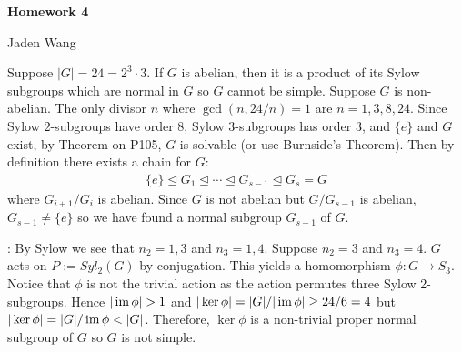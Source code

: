 \documentclass[12pt]{article}
\begin{document}
\centerline {\textsf{\textbf{\LARGE{Homework 4}}}}
\centerline {Jaden Wang}
\vspace{.15in}

\begin{problem}[1]
Suppose $|G|= 24= 2^3 \cdot 3$. If $ G$ is abelian, then it is a product of its Sylow subgroups which are normal in $ G$ so  $ G$ cannot be simple. Suppose $ G$ is non-abelian. The only divisor $ n$ where  $ \gcd ( n,24 /n) =1$ are $ n=1,3,8,24$. Since Sylow $ 2$-subgroups have order 8, Sylow 3-subgroups has order 3, and  $ \{e\} $ and $ G$ exist, by Theorem on P105,  $ G$ is solvable (or use Burnside's Theorem). Then by definition there exists a chain for $ G$:
 \begin{align*}
	\{e\} \trianglelefteq G_1 \trianglelefteq \cdots \trianglelefteq   G_{s-1} \trianglelefteq G_s = G 
\end{align*}
where $ G_{i+1} / G_i$ is abelian. Since $ G$ is not abelian but  $ G / G_{s-1}$ is abelian, $ G_{s-1} \neq \{e\} $ so we have found a normal subgroup $ G_{s-1}$ of $ G$.

 : By Sylow we see that $ n_2 = 1,3$ and $ n_3 = 1,4$. Suppose $ n_2 = 3$ and $ n_3 =4$. $ G$ acts on  $ P := Syl_{ 2}( G) $ by conjugation. This yields a homomorphism $ \phi: G \to S_3$. Notice that $ \phi$ is not the trivial action as the action permutes three Sylow 2-subgroups. Hence  $ |\operatorname{im} \phi| > 1 $ and $ | \ker \phi| = |G| / | \operatorname{im} \phi| \geq 24 / 6 = 4$ but $ | \ker \phi| = |G| / \operatorname{im} \phi < |G|$. Therefore, $ \ker \phi$ is a non-trivial proper normal subgroup of $ G$ so $ G$ is not simple.
\end{problem}
\end{document}
